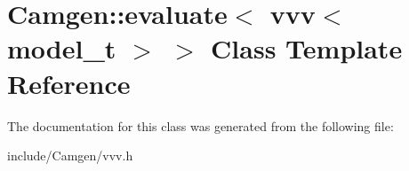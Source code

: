 \hypertarget{a00210}{}\section{Camgen\+:\+:evaluate$<$ vvv$<$ model\+\_\+t $>$ $>$ Class Template Reference}
\label{a00210}


The documentation for this class was generated from the following file\+:\begin{DoxyCompactItemize}
\item 
include/\+Camgen/vvv.\+h\end{DoxyCompactItemize}

